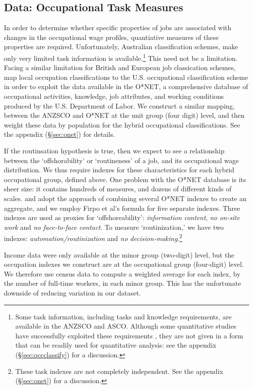 \subsection{Data: Occupational Task Measures}

In order to determine whether specific properties of jobs are associated with changes in the occupational wage profiles, quantiative measures of these properties are required. Unfortunately, Australian classification schemes, make only very limited task information is available.\footnote{Some task information, including tasks and knowledge requirements, are available in the ANZSCO and ASCO. Although some quantitative studies have successfully exploited these requirements \citep[e.g.]{Barnes2002}, they are not given in a form that can be readily used for quantitative analysis: see the appendix (\S\ref{sec:occclassify}) for a discussion.} This need not be a limitation. Facing a similar limitation for British and European job classication schemes, \citet{Goos2009} map local occupation classifications to the U.S. occupational classification scheme in order to exploit the data available in the O*NET, a comprehensive database of occupational activities, knowledge, job attributes, and working conditions produced by the U.S. Department of Labor. We construct a similar mapping, between the ANZSCO and O*NET at the unit group (four digit) level, and then weight these data by population for the hybrid occupational classifications. See the appendix (\S\ref{sec:onet}) for details.

If the routinsation hypothesis is true, then we expect to see a relationship between the `offshorability' or `routineness' of a job, and its occupational wage distribution. We thus require indexes for these characteristics for each hybrid occupational group, defined above. One problem with the O*NET database is its sheer size: it contains hundreds of measures, and dozens of different kinds of scales. \citet{Jensen2010} and \citet{Firpo2011} adopt the approach of combining several O*NET indexes to create an aggregate, and we employ Firpo et al's formula for five separate indexes. Three indexes are used as proxies for `offshoreability': {\em information content}, {\em no on-site work} and {\em no face-to-face contact}. To measure `routinization,' we have two indexes: {\em automation/routinization} and {\em no decision-making}.\footnote{These task indexes are not completely independent. See the appendix (\S\ref{sec:onet}) for a discussion.}

Income data were only available at the minor group (two-digit) level, but the occupation indexes we construct are at the occupational group (four-digit) level. We therefore use census data to compute a weighted average for each index, by the number of full-time workers, in each minor group. This has the unfortunate downside of reducing variation in our dataset. %

